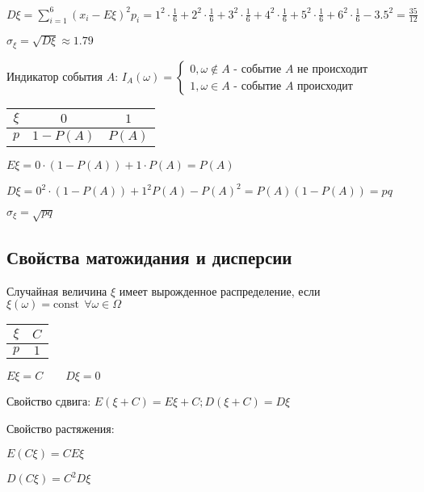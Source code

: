 \documentclass[12pt]{article}
\begin{document}
    $D\xi = \sum_{i = 1}^6 (x_i - E\xi)^2 p_i = 1^2 \cdot \frac{1}{6} + 2^2 \cdot \frac{1}{6} + 3^2 \cdot \frac{1}{6} + 4^2 \cdot \frac{1}{6} + 5^2 \cdot \frac{1}{6} + 6^2 \cdot \frac{1}{6} - 3.5^2 = \frac{35}{12} $

    $\sigma_\xi = \sqrt{D\xi} \approx 1.79$

     Индикатор события $A$: $I_A (\omega) = \begin{cases}
                                                       0, \omega \notin A \text{ - событие } A \text{ не происходит} \\ 1, \omega \in A \text{ - событие } A \text{ происходит}
    \end{cases}$

    \begin{tabular}{c|c|c}
        $\xi$ & $0$        & $1$    \\
        \hline
        $p$   & $1 - P(A)$ & $P(A)$
    \end{tabular}

    $E\xi = 0 \cdot (1 - P(A)) + 1 \cdot P(A) = P(A)$

    $D\xi = 0^2 \cdot (1 - P(A)) + 1^2 P(A) - P(A)^2 = P(A) (1 - P(A)) = pq$

    $\sigma_\xi = \sqrt{pq}$

    \hypertarget{expectedvalueandvarianceproperties}{}

    \subsection{Свойства матожидания и дисперсии}

    \begin{MyTheorem}
         Случайная величина $\xi$ имеет вырожденное распределение, если $\xi(\omega) = \mathrm{const} \ \ \forall \omega \in \Omega$

        \begin{tabular}{c|c}
            $\xi$ & $C$ \\
            \hline
            $p$   & $1$
        \end{tabular}

        $E\xi = C \qquad D\xi = 0$
    \end{MyTheorem}

    \begin{MyTheorem}
         Свойство сдвига: $E(\xi + C) = E\xi + C; D (\xi + C) = D\xi$
    \end{MyTheorem}

    \begin{MyTheorem}
         Свойство растяжения:

        $E(C\xi) = CE\xi$

        $D(C\xi) = C^2 D\xi$
    \end{MyTheorem}
\end{document}
